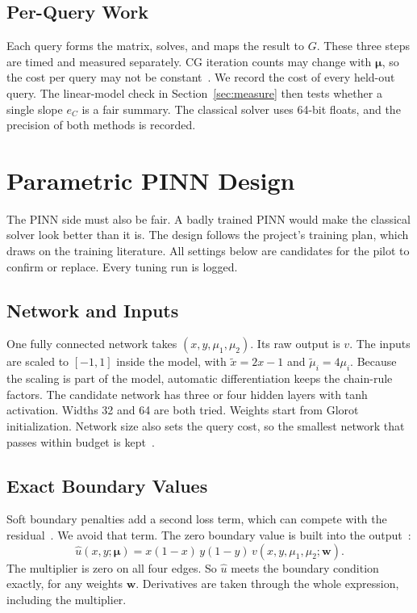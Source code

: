 \documentclass[journal]{IEEEtran}
\begin{document}
\subsection{Per-Query Work}
Each query forms the matrix, solves, and maps the result to $G$. These three steps are timed and measured separately. CG iteration counts may change with $\boldsymbol{\mu}$, so the cost per query may not be constant~\cite{zhang2026}. We record the cost of every held-out query. The linear-model check in Section~\ref{sec:measure} then tests whether a single slope $e_C$ is a fair summary. The classical solver uses 64-bit floats, and the precision of both methods is recorded.

\section{Parametric PINN Design}\label{sec:pinn}

The PINN side must also be fair. A badly trained PINN would make the classical solver look better than it is. The design follows the project's training plan, which draws on the training literature. All settings below are candidates for the pilot to confirm or replace. Every tuning run is logged.

\subsection{Network and Inputs}
One fully connected network takes $(x,y,\mu_1,\mu_2)$. Its raw output is $v$. The inputs are scaled to $[-1,1]$ inside the model, with $\tilde x=2x-1$ and $\tilde\mu_i=4\mu_i$. Because the scaling is part of the model, automatic differentiation keeps the chain-rule factors. The candidate network has three or four hidden layers with tanh activation. Widths 32 and 64 are both tried. Weights start from Glorot initialization. Network size also sets the query cost, so the smallest network that passes within budget is kept~\cite{urban2025}.

\subsection{Exact Boundary Values}
Soft boundary penalties add a second loss term, which can compete with the residual~\cite{wang2021gradient,wang2022ntk}. We avoid that term. The zero boundary value is built into the output~\cite{sukumar2022,sun2020}:
\begin{equation}
\hat u(x,y;\boldsymbol{\mu})=x(1-x)\,y(1-y)\,v(x,y,\mu_1,\mu_2;\mathbf{w}).
\label{eq:hard}
\end{equation}
The multiplier is zero on all four edges. So $\hat u$ meets the boundary condition exactly, for any weights $\mathbf{w}$. Derivatives are taken through the whole expression, including the multiplier.
\end{document}
